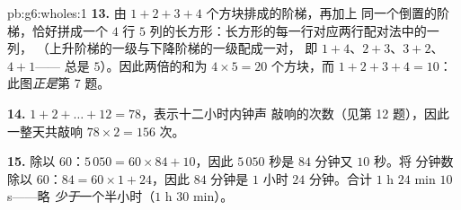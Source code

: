 \begin{solution}{pb:g6:wholes:1}
\textbf{13.} 由 $1 + 2 + 3 + 4$ 个方块排成的阶梯，再加上
同一个倒置的阶梯，恰好拼成一个 $4$ 行 $5$
列的长方形：长方形的每一行对应两行配对法中的一列，
（上升阶梯的一级与下降阶梯的一级配成一对，
即 $1 + 4$、$2 + 3$、$3 + 2$、$4 + 1$——
总是 $5$）。因此两倍的和为 $4 \times 5 = 20$ 个方块，而
$1 + 2 + 3 + 4 = 10$：此图\emph{正是}第 7 题。

\textbf{14.} $1 + 2 + \dots + 12 = 78$，表示十二小时内钟声
敲响的次数（见第 12 题），因此一整天共敲响 $78 \times 2 = 156$ 次。

\textbf{15.} 除以 $60$：$5\,050 = 60 \times 84 + 10$，因此
$5\,050$ 秒是 $84$ 分钟又 $10$ 秒。将
分钟数除以 $60$：$84 = 60 \times 1 + 24$，因此 $84$ 分钟是
$1$ 小时 $24$ 分钟。合计 $1$ h $24$ min $10$ s——略
\emph{少于}一个半小时（$1$ h $30$ min）。
\end{solution}
